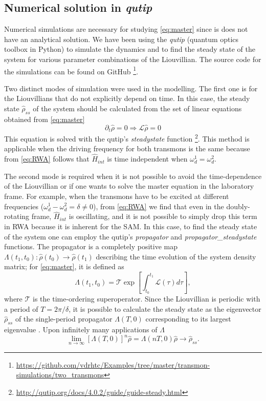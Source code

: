 \documentclass[%
 aps, prx,
 amsmath,amssymb,
 reprint,%
superscriptaddress
]{revtex4-2}
\begin{document}
\subsection{Numerical solution in \textit{qutip}}


Numerical simulations are necessary for studying 
\autoref{eq:master} since is does not have an 
analytical solution. We have been using the 
\textit{qutip} \cite{johansson2013qutip} (quantum 
optics toolbox in Python) to simulate the 
dynamics and to find the steady state of the 
system for various parameter combinations of the 
Liouvillian. The source code for the simulations can be found on GitHub \footnote{\url{https://github.com/vdrhtc/Examples/tree/master/transmon-simulations/two_transmons}}. 

Two distinct modes of simulation were used in the 
modelling. The first one is for the Liouvillians 
that do not explicitly depend on time. In this 
case, the steady state $\hat \rho_{ss}$ of the 
system should be calculated from the set of 
linear equations obtained from \autoref{eq:master}
\begin{equation}
\partial_t \hat \rho = 0  \Rightarrow \mathcal{L} 
\hat \rho = 0
\label{eq:steady}
\end{equation}
This equation is solved with the qutip's 
\textit{steadystate} 
function \footnote{\url{http://qutip.org/docs/4.0.2/guide/guide-steady.html}}.
 This method is applicable when the driving 
frequency for both transmons is the same because 
from \autoref{eq:RWA} follows that $\hat H_{int}$ 
is time independent when $\omega_d^1 = 
\omega_d^2$.

The second mode is required when it is not 
possible to avoid the time-dependence of the 
Liouvillian or if one wants to solve the master 
equation in the laboratory frame. For example, 
when the transmons have to be excited at 
different frequencies ($\omega_d^1 - \omega_d^2 = 
\delta \neq 0$), from \autoref{eq:RWA} we find 
that even in the doubly-rotating frame, $\hat 
H_{int}$ is oscillating, and it is not possible 
to simply drop this term in RWA because it is 
inherent for the SAM. In this case, to find the 
steady state of the system one can employ the 
qutip's \textit{propagator} and 
\textit{propagator\_steadystate} functions. The 
propagator is a completely positive map 
$\Lambda(t_1, t_0): \hat \rho(t_0) \rightarrow 
\hat \rho(t_1)$ describing the time evolution of 
the system density matrix; for 
\autoref{eq:master}, it is defined as
\begin{equation}
\Lambda(t_1, t_0) = \mathcal{T} \exp [\int_{t_0}^{t_1} \mathcal L(\tau) d\tau],
\label{eq:propagator}
\end{equation}
where $\mathcal T$ is the time-ordering 
superoperator. Since the Liouvillian is periodic 
with a period of $T = 2\pi/\delta$, it is 
possible to calculate the steady state as the 
eigenvector $\hat \rho_{ss}$ of the single-period 
propagator $\Lambda(T, 0)$ corresponding to its 
largest eigenvalue  \cite{dittrich1998quantum, 
rivas2012open}. Upon infinitely many applications 
of $\Lambda$
\[
\lim_{n\to \infty} \left[\Lambda(T, 0)\right]^n \hat \rho = \Lambda(nT, 0) \hat \rho \to \hat \rho_{ss}.
\]
\end{document}
